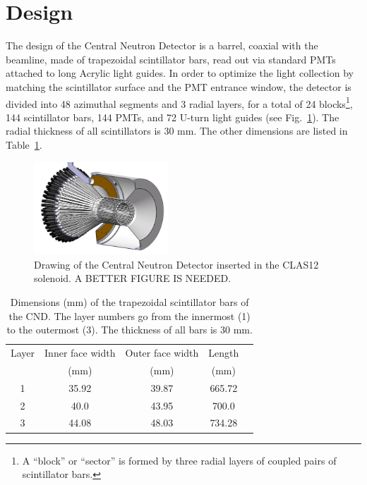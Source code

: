 \section{Design}

The design of the Central Neutron Detector is a barrel, coaxial with the beamline, made of trapezoidal scintillator bars, read out via standard PMTs attached to long Acrylic light guides. In order to optimize the light collection by matching the scintillator surface and the PMT entrance window, the detector is divided into 48 azimuthal segments and 3 radial layers, for a total of 24 blocks\footnote{A ``block'' or ``sector'' is formed by three radial layers of coupled pairs of scintillator bars.}, 144 scintillator bars, 144 PMTs, and 72 U-turn light guides (see Fig.~\ref{lab_CND_pic}). The radial thickness of all scintillators is 30 mm. The other dimensions are listed in Table~\ref{lab_scint_dim}.

\begin{figure}[htb]
  \centering
    \includegraphics[width=0.45\textwidth]{Figure/CND_pic.jpg}
 \caption{Drawing of the Central Neutron Detector inserted in the CLAS12 solenoid. A BETTER FIGURE IS NEEDED.}
    \label{lab_CND_pic}
\end{figure}

\begin{table}[tbph]
\centering
\begin{tabular}{|c|c|c|c|c|}
\hline
Layer & Inner face width & Outer face width & Length\\
 & (mm) & (mm) & (mm)\\
\hline
1 & 35.92 & 39.87 & 665.72 \\
2 & 40.0 & 43.95 & 700.0 \\
3 & 44.08 & 48.03 & 734.28 \\
\hline
\end{tabular}
\caption{Dimensions (mm) of the trapezoidal scintillator bars of the CND. The layer numbers go from the innermost (1) to the outermost (3). The thickness of all bars is 30 mm.}
\label{lab_scint_dim}

\end{table}
